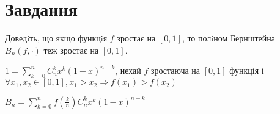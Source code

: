
\chapter{Завдання \theHchapter}

\begin{tcolorbox}[title=Завдання]
    Доведiть, що якщо функцiя $f$ зростає на $[0, 1]$, то полiном 
    Бернштейна $B_n(f, \cdot)$ теж зростає на $[0, 1]$.
\end{tcolorbox}


$ 1 = \sum\limits_{k=0}^{n}C_n^kx^k(1 - x)^{n - k} $,
нехай $f$ зростаюча на $[0, 1]$ функція і $\forall x_1, x_2 \in [0, 1],
x_1 > x_2 \Rightarrow f(x_1) > f(x_2)$


$ B_n = \sum\limits_{k=0}^{n}f(\frac{k}{n})C_n^kx^k(1 - x)^{n - k} $
